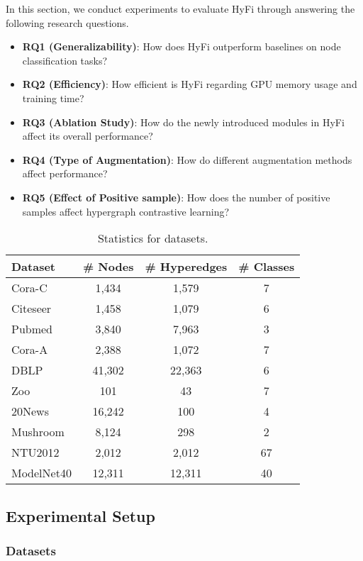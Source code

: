 In this section, we conduct experiments to evaluate HyFi through answering the following research questions.
\begin{itemize}
    \item \textbf{RQ1 (Generalizability)}: How does HyFi outperform baselines on node classification tasks?
    \item \textbf{RQ2 (Efficiency)}: How efficient is HyFi regarding GPU memory usage and training time?
    \item \textbf{RQ3 (Ablation Study)}: How do the newly introduced modules in HyFi affect its overall performance?
    \item \textbf{RQ4 (Type of Augmentation)}: How do different augmentation methods affect performance?
    \item \textbf{RQ5 (Effect of Positive sample)}: How does the number of positive samples affect hypergraph contrastive learning?
\end{itemize}

\begin{table}[t!]
\centering
\caption{Statistics for datasets.}
\begin{tabular}{lccc}
\hline
Dataset & \# Nodes & \# Hyperedges & \# Classes \\
\hline \hline
Cora-C & 1,434 & 1,579 & 7 \\
Citeseer & 1,458 & 1,079 & 6 \\
Pubmed & 3,840 & 7,963 & 3 \\
Cora-A & 2,388 & 1,072 & 7 \\
DBLP & 41,302 & 22,363 & 6 \\
Zoo & 101 & 43 & 7 \\
20News & 16,242 & 100 & 4 \\
Mushroom & 8,124 & 298 & 2 \\
NTU2012 & 2,012 & 2,012 & 67 \\
ModelNet40 & 12,311 & 12,311 & 40 \\
\hline
\end{tabular}
\label{tab:dataset}
\end{table}

\subsection{Experimental Setup}


\subsubsection{Datasets}

